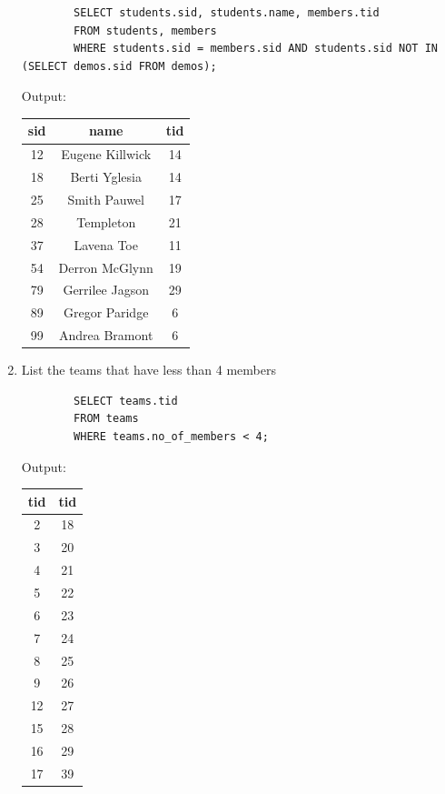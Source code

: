 \documentclass[11pt,letterpaper]{article}
\begin{document}
\begin{enumerate}
		\begin{verbatim}
		SELECT students.sid, students.name, members.tid
		FROM students, members
		WHERE students.sid = members.sid AND students.sid NOT IN (SELECT demos.sid FROM demos);
		\end{verbatim}
		Output:
		\begin{center}
			\begin{tabular}{ | c  c  c | }
				\hline
				sid & name & tid \\
				\hline
				12 & Eugene Killwick & 14 \\
				18 & Berti Yglesia & 14 \\
				25 & Smith Pauwel & 17 \\
				28 & Templeton & 21 \\
				37 & Lavena Toe & 11 \\
				54 & Derron McGlynn & 19 \\
				79 & Gerrilee Jagson & 29 \\
				89 & Gregor Paridge & 6 \\
				99 & Andrea Bramont & 6 \\
				\hline
			\end{tabular}
		\end{center}
		
		\item List the teams that have less than 4 members
		
		\begin{verbatim}
		SELECT teams.tid 
		FROM teams 
		WHERE teams.no_of_members < 4;
		\end{verbatim}
		Output:
		\begin{center}
			\begin{tabular}{ | c | c | }
				\hline
				tid & tid \\
				\hline
				2 & 18 \\
				3 & 20 \\
				4 & 21 \\
				5 & 22 \\
				6 & 23 \\
				7 & 24 \\
				8 & 25 \\
				9 & 26 \\
				12 & 27 \\
				15 & 28 \\
				16 & 29 \\
				17 & 39 \\
				\hline
			\end{tabular}
		\end{center}
		

\end{enumerate}
\end{document}
